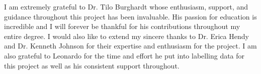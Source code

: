 I am extremely grateful to Dr. Tilo Burghardt whose enthusiasm, support, and guidance throughout this project has been invaluable. His passion for education is incredible and I will forever be thankful for his contributions throughout my entire degree. I would also like to extend my sincere thanks to Dr. Erica Hendy and Dr. Kenneth Johnson for their expertise and enthusiasm for the project. I am also grateful to Leonardo for the time and effort he put into labelling data for this project as well as his consistent support throughout.